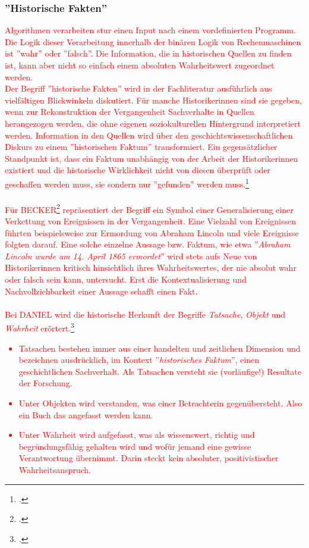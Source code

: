 \documentclass[12pt,a4paper]{article}
\begin{document}
\subsubsection{''Historische Fakten''}
\label{HistorischeFakten}
\textcolor{red}
{
Algorithmen verarbeiten stur einen Input nach einem vordefinierten Programm. Die Logik dieser Verarbeitung innerhalb der binären Logik von Rechenmaschinen ist ''wahr'' oder ''falsch''. Die Information, die in historischen Quellen zu finden ist, kann aber nicht so einfach einem absoluten Wahrheitswert zugeordnet werden.  
\\
Der Begriff ''historische Fakten'' wird in der Fachliteratur ausführlich aus vielfältigen Blickwinkeln diskutiert. Für manche Historikerinnen sind sie gegeben, wenn zur Rekonstruktion der Vergangenheit Sachverhalte in Quellen herangezogen werden, die ohne eigenen soziokulturellen Hintergrund interpretiert werden. Information in den Quellen wird über den geschichtswissenschaftlichen Diskurs zu einem ''historischen Faktum'' transformiert. Ein gegensätzlicher Standpunkt ist, dass ein Faktum unabhängig von der Arbeit der Historikerinnen existiert und die historische Wirklichkeit nicht von diesen überprüft oder geschaffen werden muss, sie sondern nur ''gefunden'' werden muss.\footcite{evans1998fakten}
\\
\\
Für BECKER\footcite{becker1955historical} repräsentiert der Begriff ein Symbol einer Generalisierung einer Verkettung von Ereignissen in der Vergangenheit. Eine Vielzahl von Ereignissen führten beispielsweise zur Ermordung von Abraham Lincoln und viele Ereignisse folgten darauf. Eine solche einzelne Aussage bzw. Faktum, wie etwa ''\textit{Abraham Lincoln wurde am 14. April 1865 ermordet}'' wird stets aufs Neue von Historikerinnen kritisch hinsichtlich ihres Wahrheitswertes, der nie absolut wahr oder falsch sein kann, untersucht. Erst die Kontextualisierung und Nachvollziehbarkeit einer Aussage schafft einen Fakt.  
\\
\\
Bei DANIEL wird die historische Herkunft der Begriffe \textit{Tatsache}, \textit{Objekt} und \textit{Wahrheit} erörtert.\footcite[][S.381-398]{daniel2006kulurgeschichte}
\begin{itemize}
\item Tatsachen bestehen immer aus einer handelten und zeitlichen Dimension und bezeichnen ausdrücklich, im Kontext ''\textit{historisches Faktum}'', einen geschichtlichen Sachverhalt.
Als Tatsachen versteht sie (vorläufige!) Resultate der Forschung. 
\item Unter Objekten wird verstanden, was einer Betrachterin gegenübersteht. Also ein Buch das angefasst werden kann.
\item Unter Wahrheit wird aufgefasst, was als wissenswert, richtig und begründungsfähig gehalten wird und wofür jemand eine gewisse Verantwortung übernimmt. Darin steckt kein absoluter, positivistischer Wahrheitsanspruch.
\end{itemize}
}
\end{document}
